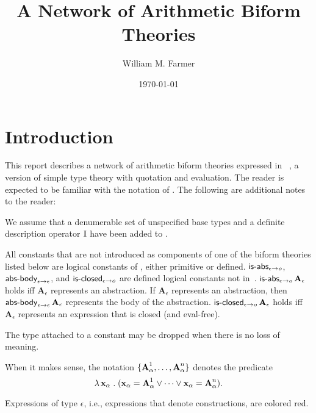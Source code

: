 \documentclass[fleqn,11pt]{article}
\title{{\bf A Network of Arithmetic Biform Theories}}
\author{William M. Farmer}
\date{\today}
\begin{document}
\maketitle

\section{Introduction}

This report describes a network of arithmetic biform theories
expressed in {\churchqe}~\cite{FarmerArxiv16}, a version of simple
type theory with quotation and evaluation.  The reader is expected to
be familiar with the notation of {\churchqe}.  The following are
additional notes to the reader:

\be

  \item We assume that a denumerable set of unspecified base types and
    a definite description operator $\mbox{\rm I}$ have been added to
    {\churchqe}.

  \item All constants that are not introduced as components of one of
    the biform theories listed below are logical constants of
    {\churchqe}, either primitive or defined.
    $\mbox{\sf is-abs}_{\epsilon \rightarrow o}$, $\mbox{\sf abs-body}_{\epsilon
      \rightarrow \epsilon}$, and $\mbox{\sf is-closed}_{\epsilon \rightarrow o}$
    are defined logical constants not in~\cite{FarmerArxiv16}.
    $\mbox{\sf is-abs}_{\epsilon \rightarrow o} \, \textbf{A}_\epsilon$ holds
    iff $\textbf{A}_\epsilon$ represents an abstraction.  If
    $\textbf{A}_\epsilon$ represents an abstraction, then
    $\mbox{\sf abs-body}_{\epsilon \rightarrow \epsilon} \,
    \textbf{A}_\epsilon$ represents the body of the abstraction.
    $\mbox{\sf is-closed}_{\epsilon \rightarrow o} \, \textbf{A}_\epsilon$
    holds iff $\textbf{A}_\epsilon$ represents an expression that is
    closed (and eval-free).

  \item The type attached to a constant may be dropped when there is
    no loss of meaning.

  \item When it makes sense, the notation
    ${\{ \textbf{A}_{\alpha}^{1}, \ldots, \textbf{A}_{\alpha}^{n} \}}$
    denotes the predicate
    \[\lambda\, \textbf{x}_\alpha \mathrel. 
    (\textbf{x}_\alpha = \textbf{A}_{\alpha}^{1} \vee \cdots \vee
    \textbf{x}_\alpha = \textbf{A}_{\alpha}^{n}).\]

  \item Expressions of type $\epsilon$, i.e., expressions that denote
    constructions, are colored red.
\end{document}

